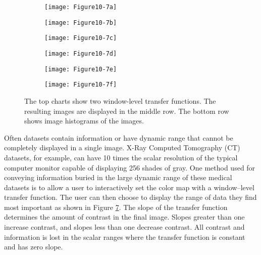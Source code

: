 \begin{figure}[htb]
	\begin{subfigure}[h]{0.42\linewidth}
		\texttt{[image: Figure10-7a]}
		\captionsetup{justification=centering}
		\caption*{}
		\label{fig:Figure10-7a}
	\end{subfigure}
	\hfill
	\begin{subfigure}[h]{0.42\linewidth}
		\texttt{[image: Figure10-7b]}
		\captionsetup{justification=centering}
		\caption*{}
		\label{fig:Figure10-7b}
	\end{subfigure}
	\hfill
	\begin{subfigure}[h]{0.42\linewidth}
		\texttt{[image: Figure10-7c]}
		\captionsetup{justification=centering}
		\caption*{}
		\label{fig:Figure10-7c}
	\end{subfigure}
	\hfill
	\begin{subfigure}[h]{0.42\linewidth}
		\texttt{[image: Figure10-7d]}
		\captionsetup{justification=centering}
		\caption*{}
		\label{fig:Figure10-7d}
	\end{subfigure}
	\hfill
	\begin{subfigure}[h]{0.42\linewidth}
		\texttt{[image: Figure10-7e]}
		\captionsetup{justification=centering}
		\caption*{}
		\label{fig:Figure10-7e}
	\end{subfigure}
	\hfill
	\begin{subfigure}[h]{0.42\linewidth}
		\texttt{[image: Figure10-7f]}
		\captionsetup{justification=centering}
		\caption*{}
		\label{fig:Figure10-7f}
	\end{subfigure}
	\caption{The top charts show two window-level transfer functions. The resulting images are displayed in the middle row. The bottom row shows image histograms of the images.}\label{fig:Figure10-7}
\end{figure}

Often datasets contain information or have dynamic range that cannot be completely displayed in a single image. X-Ray Computed Tomography (CT) datasets, for example, can have 10 times the scalar resolution of the typical computer monitor capable of displaying 256 shades of gray. One method used for conveying information buried in the large dynamic range of these medical datasets is to allow a user to interactively set the color map with a window--level transfer function. The user can then choose to display the range of data they find most important as shown in Figure \ref{fig:Figure10-7}. The slope of the transfer function determines the amount of contrast in the final image. Slopes greater than one increase contrast, and slopes less than one decrease contrast. All contrast and information is lost in the scalar ranges where the transfer function is constant and has zero slope.

